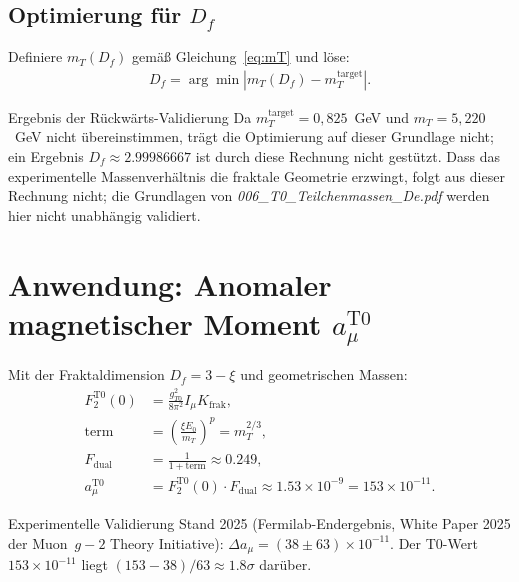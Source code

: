 	\subsection{Optimierung für $D_f$}
	\label{subsec:optimierung_df}
	
	Definiere $m_T(D_f)$ gemäß Gleichung~\ref{eq:mT} und löse:
	\begin{align}
		D_f = \arg\min \left| m_T(D_f) - m_T^{\text{target}} \right|. \label{eq:optDf}
	\end{align}
	
	\begin{keyresult}{Ergebnis der Rückwärts-Validierung}{}
		Da $m_T^{\text{target}} = 0{,}825$~GeV und $m_T = 5{,}220$~GeV nicht übereinstimmen, trägt die Optimierung auf dieser Grundlage nicht; ein Ergebnis $D_f \approx 2.99986667$ ist durch diese Rechnung nicht gestützt. Dass das experimentelle Massenverhältnis die fraktale Geometrie erzwingt, folgt aus dieser Rechnung nicht; die Grundlagen von \emph{006\_T0\_Teilchenmassen\_De.pdf} werden hier nicht unabhängig validiert.
	\end{keyresult}
	
	\section{Anwendung: Anomaler magnetischer Moment $a_{\mu}^{\text{T0}}$}
	\label{sec:anwendung_g2}
	
	Mit der Fraktaldimension $D_f = 3 - \xi$ und geometrischen Massen:
	\begin{align}
		F_2^{\text{T0}}(0) &= \frac{g_{T0}^2}{8 \pi^2} I_{\mu} K_{\text{frak}}, \label{eq:F2} \\
		\text{term} &= \left( \frac{\xi E_0}{m_T} \right)^p = m_T^{2/3}, \label{eq:term} \\
		F_{\text{dual}} &= \frac{1}{1 + \text{term}} \approx 0.249, \label{eq:Fdual} \\
		a_{\mu}^{\text{T0}} &= F_2^{\text{T0}}(0) \cdot F_{\text{dual}} \approx 1.53 \times 10^{-9} = 153 \times 10^{-11}. \label{eq:amu}
	\end{align}
	
	\begin{result}{Experimentelle Validierung}{}
		Stand 2025 (Fermilab-Endergebnis, White Paper 2025 der Muon~$g-2$ Theory Initiative): $\Delta a_\mu = (38 \pm 63) \times 10^{-11}$. Der T0-Wert $153 \times 10^{-11}$ liegt $(153 - 38)/63 \approx 1.8\sigma$ darüber.
	\end{result}
	
